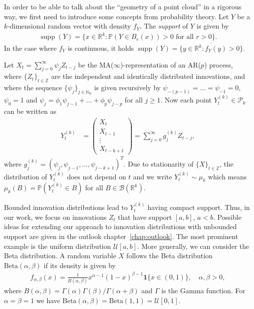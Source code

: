 In order to be able to talk about the \enquote{geometry of a point cloud} in a rigorous way, we first need to introduce some concepts from probability theory. Let $Y$ be a $k$-dimensional random vector with density $f_Y$. The \textit{support} of $Y$ is given by
\begin{align*}
    \operatorname{supp}(Y)=\{x\in\mathbb{R}^k:\mathbb{P}(Y\in B_r(x))>0\text{ for all }r>0\}.
\end{align*}
In the case where $f_Y$ is continuous, it holds $\operatorname{supp}(Y)=\overline{\{y\in\mathbb{R}^{k}:f_Y(y)>0\}}$.

Let $X_t=\sum_{j=0}^{\infty}\psi_j Z_{t-j}$ be the MA($\infty$)-representation of an AR($p$) process, where $\{Z_t\}_{t\in\mathbb{Z}}$ are the independent and identically distributed innovations, and where the sequence $\{\psi_j\}_{j\in\mathbb{N}_0}$ is given recursively by $\psi_{-(p-1)}=\dots=\psi_{-1}=0$, $\psi_0=1$ and $\psi_j=\phi_1\psi_{j-1}+\dots+\phi_p\psi_{j-p}$ for all $j\ge 1$. Now each point $Y_t^{(k)}\in\mathcal{P}_k$ can be written as
\begin{align}\label{eq:sliding_window_point_representation}
    Y_{t}^{(k)}&=\begin{pmatrix}
        X_t\\
        X_{t-1}\\
        \vdots\\
        X_{t-k+1}
    \end{pmatrix}=\sum_{j=0}^{\infty}g_j^{(k)}Z_{t-j},
\end{align}
where $g_j^{(k)}=(\psi_j,\psi_{j-1},\dots,\psi_{j-k+1})^{T}$. Due to stationarity of $\{X\}_{t\in\mathbb{Z}}$, the distribution of $Y_t^{(k)}$ does not depend on $t$ and we write $Y_t^{(k)}\sim\mu_k$ which means $\mu_k(B)=\mathbb{P}(Y_t^{(k)}\in B)$ for all $B\in\mathcal{B}(\mathbb{R}^{k})$.

Bounded innovation distributions lead to $Y_t^{(k)}$ having compact support. Thus, in our work, we focus on innovations $Z_t$ that have support $[a,b]$, $a<b$. Possible ideas for extending our approach to innovation distributions with unbounded support are given in the outlook chapter~\ref{chap:outlook}. The most prominent example is the uniform distribution $\mathcal{U}[a,b]$. More generally, we can consider the Beta distribution. A random variable $X$ follows the Beta distribution $\text{Beta}(\alpha,\beta)$ if its density is given by
\begin{align*}
    f_{\alpha,\beta}(x)=\frac{1}{B(\alpha,\beta)}x^{\alpha-1}(1-x)^{\beta-1}\mathbf{1}\{x\in(0,1)\},\quad\alpha,\beta>0,
\end{align*}
where $B(\alpha,\beta)=\Gamma(\alpha)\Gamma(\beta)/\Gamma(\alpha+\beta)$ and $\Gamma$ is the Gamma function. For $\alpha=\beta=1$ we have $\text{Beta}(\alpha,\beta)=\text{Beta}(1,1)=\mathcal{U}[0,1]$.

